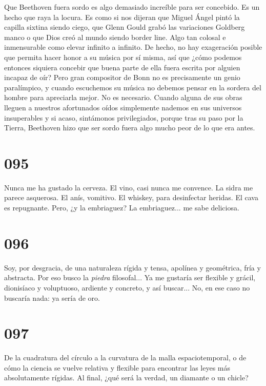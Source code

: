 \documentclass[a4paper,11pt,openright,twocolumn]{book}
\begin{document}
Que Beethoven fuera sordo es algo demasiado increíble para ser concebido. Es un hecho que raya la locura.
Es como si nos dijeran que Miguel Ángel pintó la capilla sixtina siendo ciego, que Glenn Gould grabó
las variaciones Goldberg manco o que Dios creó al mundo siendo border line. Algo tan colosal e inmensurable como
elevar infinito a infinito. De hecho, no hay exageración posible que permita hacer honor a su música por sí misma,
así que ¿cómo podemos entonces siquiera concebir que buena parte de ella fuera escrita por alguien incapaz de oír? 
Pero gran compositor de Bonn no es precisamente un genio paralímpico, y cuando escuchemos su música no debemos
pensar en la sordera del hombre para apreciarla mejor. No es necesario. Cuando alguna de sus obras lleguen a nuestros
afortunados oídos simplemente nademos en sus universos insuperables y si acaso, sintámonos privilegiados, porque tras
su paso por la Tierra, Beethoven hizo que ser sordo fuera algo mucho peor de lo que era antes.


\section*{095}

Nunca me ha gustado la cerveza. El vino, casi nunca me convence. La sidra me
parece asquerosa. El anís, vomitivo. El whiskey, para desinfectar heridas. El cava 
es repugnante. Pero, ¿y la embriaguez? La embriaguez... me sabe deliciosa. 

\section*{096}

Soy, por desgracia, de una naturaleza rígida y tensa, apolínea y geométrica, fría y abstracta.
Por eso busco la {\it piedra}   filosofal... Ya me gustaría ser flexible y grácil, dionisíaco y
voluptuoso, ardiente y concreto, y así buscar... No, en ese caso no buscaría nada: ya sería de oro. 

\section*{097}

De la cuadratura del círculo a la curvatura de la malla espaciotemporal, o de cómo la ciencia se vuelve relativa y flexible
para encontrar las leyes más absolutamente rígidas. Al final, ¿qué será la verdad, un diamante o un chicle? 
\end{document}
